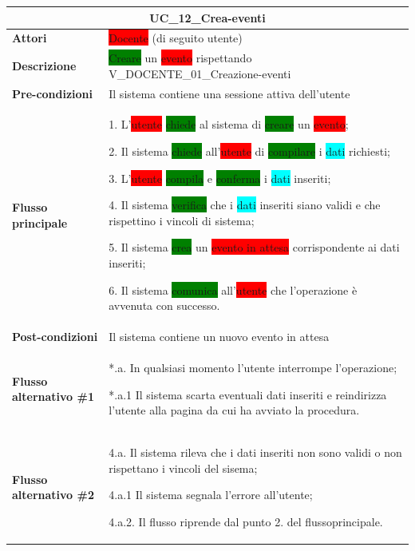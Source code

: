 \documentclass[11pt]{article}
\begin{document}
\begin{table}[H]
\centering
\begin{tabularx}{1\textwidth}{|l|X|}
\hline
\multicolumn{2}{|c|}{\textbf{UC\_12\_Crea-eventi}}\\
\hline \textbf{Attori} & \colorbox{red}{Docente} (di seguito utente)\\
\hline \textbf{Descrizione} & \colorbox{green}{Creare} un \colorbox{red}{evento} rispettando V\_DOCENTE\_01\_Creazione-eventi\\
\hline \textbf{Pre-condizioni} & Il sistema contiene una sessione attiva dell'utente\\
\hline \textbf{Flusso principale} &
1. L'\colorbox{red}{utente} \colorbox{green}{chiede} al sistema di \colorbox{green}{creare} un \colorbox{red}{evento};

2. Il sistema \colorbox{green}{chiede} all'\colorbox{red}{utente} di \colorbox{green}{compilare} i \colorbox{cyan}{dati} richiesti;

3. L'\colorbox{red}{utente} \colorbox{green}{compila} e \colorbox{green}{conferma} i \colorbox{cyan}{dati} inseriti;

4. Il sistema \colorbox{green}{verifica} che i \colorbox{cyan}{dati} inseriti siano validi e che rispettino i vincoli di sistema;

5. Il sistema \colorbox{green}{crea} un \colorbox{red}{evento in attesa} corrispondente ai dati inseriti;

6. Il sistema \colorbox{green}{comunica} all'\colorbox{red}{utente} che l'operazione è avvenuta con successo.
\\
\hline \textbf{Post-condizioni} & Il sistema contiene un nuovo evento in attesa\\
\hline \textbf{Flusso alternativo \#1} & 
*.a. In qualsiasi momento l'utente interrompe l'operazione;

*.a.1 Il sistema scarta eventuali dati inseriti e reindirizza l'utente alla pagina da cui ha avviato la procedura.\\
\hline \textbf{Flusso alternativo \#2} &
4.a. Il sistema rileva che i dati inseriti non sono validi o non rispettano i vincoli del sisema;

4.a.1 Il sistema segnala l'errore all'utente;

4.a.2. Il flusso riprende dal punto 2. del flussoprincipale.
\\ 
\hline
\end{tabularx}
\end{table}
\end{document}
